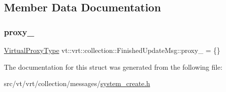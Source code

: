 \subsection{Member Data Documentation}
\mbox{\label{structvt_1_1vrt_1_1collection_1_1_finished_update_msg_a1058ef4d7be406b0cfa0eb768f7ec242}} 
\subsubsection{\texorpdfstring{proxy\+\_\+}{proxy\_}}
{\footnotesize\ttfamily \hyperlink{namespacevt_a1b417dd5d684f045bb58a0ede70045ac}{Virtual\+Proxy\+Type} vt\+::vrt\+::collection\+::\+Finished\+Update\+Msg\+::proxy\+\_\+ = \{\}}



The documentation for this struct was generated from the following file\+:\begin{DoxyCompactItemize}
\item 
src/vt/vrt/collection/messages/\hyperlink{system__create_8h}{system\+\_\+create.\+h}\end{DoxyCompactItemize}
